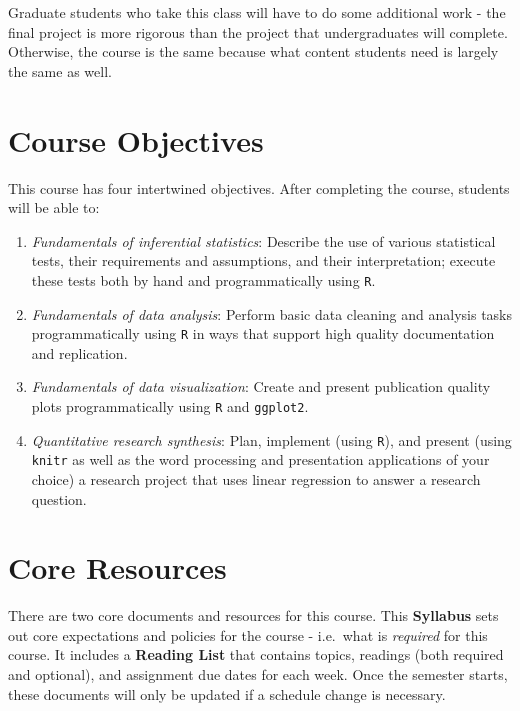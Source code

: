 \documentclass[]{book}
\theoremstyle{definition}
\theoremstyle{definition}
\theoremstyle{definition}
\theoremstyle{remark}
\begin{document}
Graduate students who take this class will have to do some additional
work - the final project is more rigorous than the project that
undergraduates will complete. Otherwise, the course is the same because
what content students need is largely the same as well.

\hypertarget{course-objectives}{%
\section{Course Objectives}\label{course-objectives}}

This course has four intertwined objectives. After completing the
course, students will be able to:

\begin{enumerate}
\def\labelenumi{\arabic{enumi}.}
\item
  \emph{Fundamentals of inferential statistics}: Describe the use of
  various statistical tests, their requirements and assumptions, and
  their interpretation; execute these tests both by hand and
  programmatically using \texttt{R}.
\item
  \emph{Fundamentals of data analysis}: Perform basic data cleaning and
  analysis tasks programmatically using \texttt{R} in ways that support
  high quality documentation and replication.
\item
  \emph{Fundamentals of data visualization}: Create and present
  publication quality plots programmatically using \texttt{R} and
  \texttt{ggplot2}.
\item
  \emph{Quantitative research synthesis}: Plan, implement (using
  \texttt{R}), and present (using \texttt{knitr} as well as the word
  processing and presentation applications of your choice) a research
  project that uses linear regression to answer a research question.
\end{enumerate}

\hypertarget{core-resources}{%
\section{Core Resources}\label{core-resources}}

There are two core documents and resources for this course. This
\textbf{Syllabus} sets out core expectations and policies for the course
- i.e.~what is \emph{required} for this course. It includes a
\textbf{Reading List} that contains topics, readings (both required and
optional), and assignment due dates for each week. Once the semester
starts, these documents will only be updated if a schedule change is
necessary.
\end{document}
